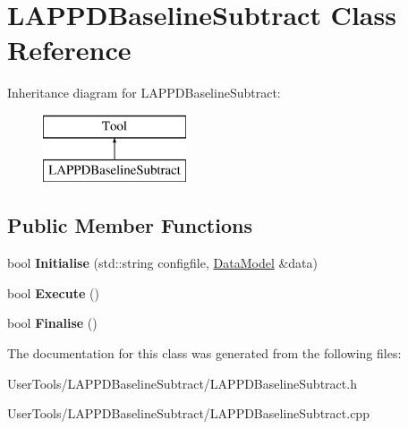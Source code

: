 \hypertarget{classLAPPDBaselineSubtract}{\section{L\-A\-P\-P\-D\-Baseline\-Subtract Class Reference}
\label{classLAPPDBaselineSubtract}
}
Inheritance diagram for L\-A\-P\-P\-D\-Baseline\-Subtract\-:\begin{figure}[H]
\begin{center}
\leavevmode
\includegraphics[height=2.000000cm]{classLAPPDBaselineSubtract}
\end{center}
\end{figure}
\subsection*{Public Member Functions}
\begin{DoxyCompactItemize}
\item 
\hypertarget{classLAPPDBaselineSubtract_a9173849be0de9676949ce9e3094c0c73}{bool {\bfseries Initialise} (std\-::string configfile, \hyperlink{classDataModel}{Data\-Model} \&data)}\label{classLAPPDBaselineSubtract_a9173849be0de9676949ce9e3094c0c73}

\item 
\hypertarget{classLAPPDBaselineSubtract_ae2ea261ef543fa9b924a1504a250b744}{bool {\bfseries Execute} ()}\label{classLAPPDBaselineSubtract_ae2ea261ef543fa9b924a1504a250b744}

\item 
\hypertarget{classLAPPDBaselineSubtract_a784d6efcf77a1cb4ad27b571f3a55d8d}{bool {\bfseries Finalise} ()}\label{classLAPPDBaselineSubtract_a784d6efcf77a1cb4ad27b571f3a55d8d}

\end{DoxyCompactItemize}


The documentation for this class was generated from the following files\-:\begin{DoxyCompactItemize}
\item 
User\-Tools/\-L\-A\-P\-P\-D\-Baseline\-Subtract/L\-A\-P\-P\-D\-Baseline\-Subtract.\-h\item 
User\-Tools/\-L\-A\-P\-P\-D\-Baseline\-Subtract/L\-A\-P\-P\-D\-Baseline\-Subtract.\-cpp\end{DoxyCompactItemize}
